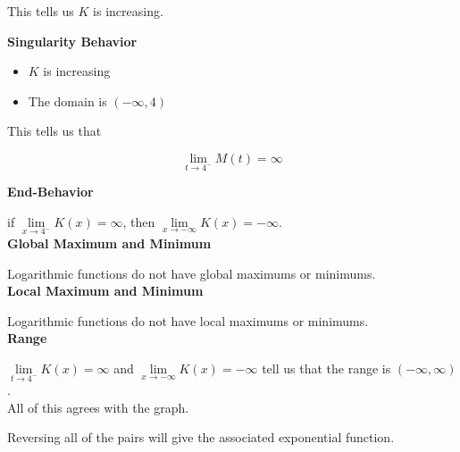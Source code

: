 \documentclass{ximera}
\begin{document}
\begin{example}
This tells us $K$ is increasing.






\textbf{Singularity Behavior}

\begin{itemize}
\item $K$ is increasing
\item The domain is $(-\infty, 4)$
\end{itemize}


This tells us that

\[
\lim\limits_{t \to 4^-} M(t) = \infty
\]





\textbf{End-Behavior}


if  $\lim\limits_{x \to 4^-} K(x) = \infty$, then $\lim\limits_{x \to -\infty} K(x) = -\infty$. \\





\textbf{Global Maximum and Minimum}

Logarithmic functions do not have global maximums or minimums. \\






\textbf{Local Maximum and Minimum}

Logarithmic functions do not have local maximums or minimums. \\




\textbf{Range}



$\lim\limits_{t \to 4^-} K(x) = \infty$ and $\lim\limits_{x \to -\infty} K(x) = -\infty$ tell us that the range is $(-\infty, \infty)$. \\


All of this agrees with the graph.










\end{example}









Reversing all of the pairs will give the associated exponential function.  \\
\end{document}
